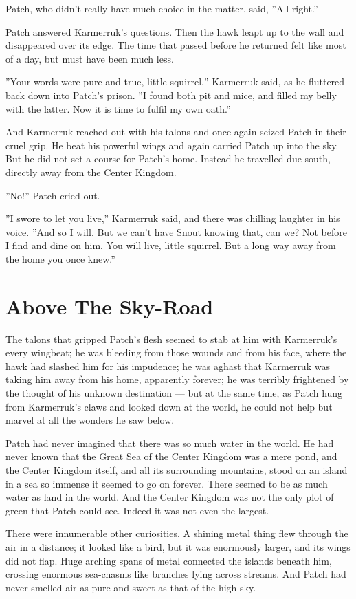 \documentclass[12pt]{book}
\begin{document}
Patch, who didn't really have much choice in the matter, said, ''All right.''

Patch answered Karmerruk's questions. Then the hawk leapt up to the wall and disappeared over its edge. The time that passed before he returned felt like most of a day, but must have been much less.

''Your words were pure and true, little squirrel,'' Karmerruk said, as he fluttered back down into Patch's prison. ''I found both pit and mice, and filled my belly with the latter. Now it is time to fulfil my own oath.''

And Karmerruk reached out with his talons and once again seized Patch in their cruel grip. He beat his powerful wings and again carried Patch up into the sky. But he did not set a course for Patch's home. Instead he travelled due south, directly away from the Center Kingdom.

''No!'' Patch cried out.

''I swore to let you live,'' Karmerruk said, and there was chilling laughter in his voice. ''And so I will. But we can't have Snout knowing that, can we? Not before I find and dine on him. You will live, little squirrel. But a long way away from the home you once knew.''


\section{Above The Sky-Road}

The talons that gripped Patch's flesh seemed to stab at him with Karmerruk's every wingbeat; he was bleeding from those wounds and from his face, where the hawk had slashed him for his impudence; he was aghast that Karmerruk was taking him away from his home, apparently forever; he was terribly frightened by the thought of his unknown destination ---
but at the same time, as Patch hung from Karmerruk's claws and looked down at the world, he could not help but marvel at all the wonders he saw below.

Patch had never imagined that there was so much water in the world. He had never known that the Great Sea of the Center Kingdom was a mere pond, and the Center Kingdom itself, and all its surrounding mountains, stood on an island in a sea so immense it seemed to go on forever. There seemed to be as much water as land in the world. And the Center Kingdom was not the only plot of green that Patch could see. Indeed it was not even the largest.

There were innumerable other curiosities. A shining metal thing flew through the air in a distance; it looked like a bird, but it was enormously larger, and its wings did not flap. Huge arching spans of metal connected the islands beneath him, crossing enormous sea-chasms like branches lying across streams. And Patch had never smelled air as pure and sweet as that of the high sky.
\end{document}

